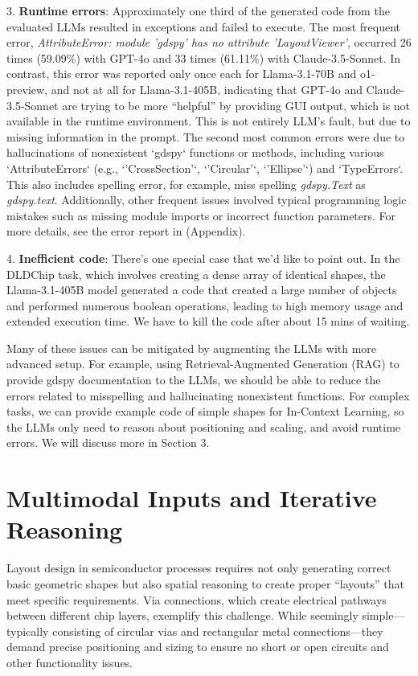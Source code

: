 \documentclass{article}
\begin{document}
  3. \textbf{Runtime errors}: Approximately one third of the generated code from the evaluated LLMs resulted in exceptions and failed to execute. The most frequent error, \textit{AttributeError: module 'gdspy' has no attribute 'LayoutViewer'}, occurred 26 times (59.09\%) with GPT-4o and 33 times (61.11\%) with Claude-3.5-Sonnet. In contrast, this error was reported only once each for Llama-3.1-70B and o1-preview, and not at all for Llama-3.1-405B, indicating that GPT-4o and Claude-3.5-Sonnet are trying to be more ``helpful'' by providing GUI output, which is not available in the runtime environment. This is not entirely LLM's fault, but due to missing information in the prompt. The second most common errors were due to hallucinations of nonexistent `gdspy` functions or methods, including various `AttributeErrors` (e.g., `'CrossSection'`, `'Circular'`, `'Ellipse'`) and `TypeErrors`. This also includes spelling error, for example, miss spelling \textit{gdspy.Text} as \textit{gdspy.text}. Additionally, other frequent issues involved typical programming logic mistakes such as missing module imports or incorrect function parameters. For more details, see the error report in (Appendix).
  
  4. \textbf{Inefficient code}: There's one special case that we'd like to point out. In the DLDChip task, which involves creating a dense array of identical shapes, the Llama-3.1-405B model generated a code that created a large number of objects and performed numerous boolean operations, leading to high memory usage and extended execution time. We have to kill the code after about 15 mins of waiting. 

Many of these issues can be mitigated by augmenting the LLMs with more advanced setup. For example, using Retrieval-Augmented Generation (RAG) to provide gdspy documentation to the LLMs, we should be able to reduce the errors related to misspelling and hallucinating nonexistent functions. For complex tasks, we can provide example code of simple shapes for In-Context Learning, so the LLMs only need to reason about positioning and scaling, and avoid runtime errors. We will discuss more in Section 3.

\section{Multimodal Inputs and Iterative Reasoning}
Layout design in semiconductor processes requires not only generating correct basic geometric shapes but also spatial reasoning to create proper ``layouts'' that meet specific requirements. Via connections, which create electrical pathways between different chip layers, exemplify this challenge. While seemingly simple—typically consisting of circular vias and rectangular metal connections—they demand precise positioning and sizing to ensure no short or open circuits and other functionality issues.
\end{document}
